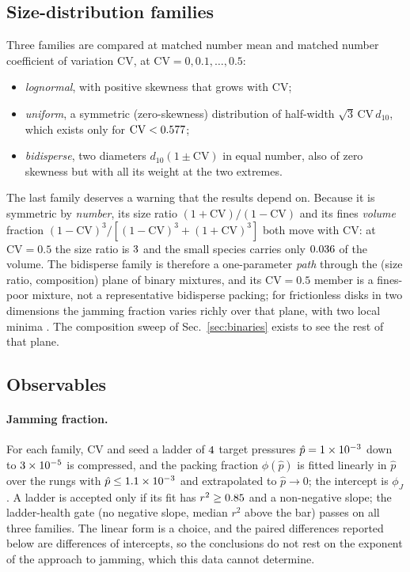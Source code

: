 \documentclass[reprint,aps,pre,amsmath,amssymb,superscriptaddress,longbibliography,nofootinbib,floatfix]{revtex4-2}
\newcommand{\phiJ}{\phi_{J}}
\newcommand{\pHat}{\hat{p}}
\newcommand{\CV}{\mathrm{CV}}
\newcommand{\dten}{d_{10}}
\begin{document}
\subsection{Size-distribution families}

Three families are compared at matched number mean and matched number coefficient of variation $\CV$, at $\CV = 0, 0.1, \ldots, 0.5$:
\begin{itemize}
\item \emph{lognormal}, with positive skewness that grows with $\CV$;
\item \emph{uniform}, a symmetric (zero-skewness) distribution of half-width $\sqrt{3}\,\CV\,\dten$, which exists only for $\CV<\uniformCvMax$;
\item \emph{bidisperse}, two diameters $\dten(1\pm\CV)$ in equal number, also of zero skewness but with all its weight at the two extremes.
\end{itemize}
The last family deserves a warning that the results depend on.
Because it is symmetric by \emph{number}, its size ratio $(1+\CV)/(1-\CV)$ and its fines \emph{volume} fraction $(1-\CV)^3/[(1-\CV)^3+(1+\CV)^3]$ both move with $\CV$: at $\CV=0.5$ the size ratio is $3$ and the small species carries only $0.036$ of the volume.
The bidisperse family is therefore a one-parameter \emph{path} through the (size ratio, composition) plane of binary mixtures, and its $\CV=0.5$ member is a fines-poor mixture, not a representative bidisperse packing; for frictionless disks in two dimensions the jamming fraction varies richly over that plane, with two local minima \cite{koeze2016mapping}.
The composition sweep of Sec.~\ref{sec:binaries} exists to see the rest of that plane.

\subsection{Observables}

\paragraph{Jamming fraction.}
For each family, $\CV$ and seed a ladder of $4$ target pressures $\pHat = \pHatTop$ down to $3\times10^{-5}$ is compressed, and the packing fraction $\phi(\pHat)$ is fitted linearly in $\pHat$ over the rungs with $\pHat\le\pHatFitMax$ and extrapolated to $\pHat\to0$; the intercept is $\phiJ$ \cite{ohern2003jamming}.
A ladder is accepted only if its fit has $r^2\ge0.85$ and a non-negative slope; the ladder-health gate (no negative slope, median $r^2$ above the bar) passes on all three families.
The linear form is a choice, and the paired differences reported below are differences of intercepts, so the conclusions do not rest on the exponent of the approach to jamming, which this data cannot determine.
\end{document}
